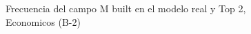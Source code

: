 \begin{figure}[H]
    \centering
    
    \caption{Frecuencia del campo M built en el modelo real y Top 2, Economicos (B-2)}
    \label{frecuency-M Built-top2}
\end{figure}